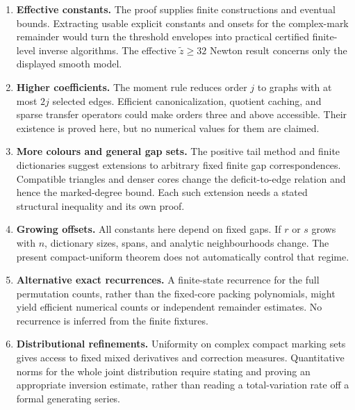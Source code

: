 \documentclass[11pt]{article}
\numberwithin{equation}{section}
\theoremstyle{definition}
\theoremstyle{remark}
\theoremstyle{definition}
\begin{document}
\begin{enumerate}[label=\textbf{Q\arabic*.},leftmargin=*]
 \item \textbf{Effective constants.} The proof supplies finite constructions
 and eventual bounds. Extracting usable explicit constants and onsets for
 the complex-mark remainder would turn the threshold envelopes into
 practical certified finite-level inverse algorithms. The effective
 $\tilde z\ge32$ Newton result concerns only the displayed smooth model.
 \item \textbf{Higher coefficients.} The moment rule reduces order $j$ to
 graphs with at most $2j$ selected edges. Efficient canonicalization,
 quotient caching, and sparse transfer operators could make orders three
 and above accessible. Their existence is proved here, but no numerical
 values for them are claimed.
 \item \textbf{More colours and general gap sets.} The positive tail method
 and finite dictionaries suggest extensions to arbitrary fixed finite gap
 correspondences. Compatible triangles and denser cores change the
 deficit-to-edge relation and hence the marked-degree bound. Each such
 extension needs a stated structural inequality and its own proof.
 \item \textbf{Growing offsets.} All constants here depend on fixed gaps.
 If $r$ or $s$ grows with $n$, dictionary sizes, spans, and analytic
 neighbourhoods change. The present compact-uniform theorem does not
 automatically control that regime.
 \item \textbf{Alternative exact recurrences.} A finite-state recurrence
 for the full permutation counts, rather than the fixed-core packing
 polynomials, might yield efficient numerical counts or independent
 remainder estimates. No recurrence is inferred from the finite fixtures.
 \item \textbf{Distributional refinements.} Uniformity on complex compact
 marking sets gives access to fixed mixed derivatives and correction
 measures. Quantitative norms for the whole joint distribution require
 stating and proving an appropriate inversion estimate, rather than
 reading a total-variation rate off a formal generating series.
\end{enumerate}
\end{document}
